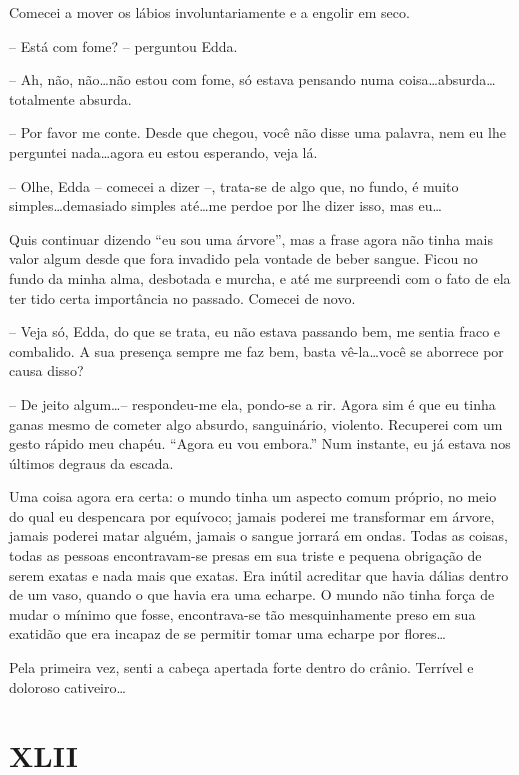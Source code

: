 Comecei a mover os lábios involuntariamente e a engolir em seco.

-- Está com fome? -- perguntou Edda.

-- Ah, não, não\dots não estou com fome, só estava pensando numa coisa\dots absurda\dots totalmente absurda.

-- Por favor me conte. Desde que chegou, você não disse uma palavra, nem eu lhe perguntei nada\dots agora eu estou esperando, veja lá.

-- Olhe, Edda -- comecei a dizer --, trata-se de algo que, no fundo, é muito simples\dots demasiado simples até\dots me perdoe por lhe 
dizer isso, mas eu\dots

Quis continuar dizendo ``eu sou uma árvore'', mas a frase agora não tinha mais valor algum desde que fora invadido pela vontade de beber sangue. Ficou no fundo da minha alma, desbotada e murcha, e até me surpreendi com o fato de ela ter tido certa importância no passado.
Comecei de novo.

-- Veja só, Edda, do que se trata, eu não estava passando bem, me sentia fraco e combalido. A sua presença sempre me faz bem, basta vê-la\dots você se aborrece por causa disso?

-- De jeito algum\dots-- respondeu-me ela, pondo-se a rir.
Agora sim é que eu tinha ganas mesmo de cometer algo absurdo, sanguinário, violento. Recuperei com um gesto rápido meu chapéu. ``Agora eu vou embora.'' Num instante, eu já estava nos últimos degraus da escada.

Uma coisa agora era certa: o mundo tinha um aspecto comum próprio, no meio do qual eu despencara por equívoco; jamais poderei me transformar em árvore, jamais poderei matar alguém, jamais o sangue jorrará em ondas. Todas as coisas, todas as pessoas encontravam-se presas em sua triste e pequena obrigação de serem exatas e nada mais que exatas. Era inútil acreditar que havia dálias dentro de um vaso, quando o que havia era uma echarpe. O mundo não tinha força de mudar o mínimo que fosse, encontrava-se tão mesquinhamente preso em sua exatidão que era incapaz de se permitir tomar uma echarpe por flores\dots

Pela primeira vez, senti a cabeça apertada forte dentro do crânio. Terrível e doloroso cativeiro\dots


\chapter*{\centering\Large{XLII}}


